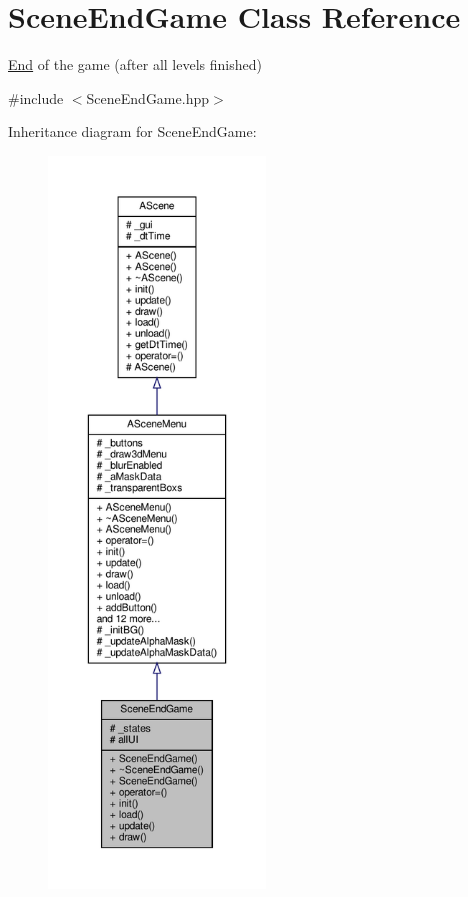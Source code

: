\hypertarget{class_scene_end_game}{}\section{Scene\+End\+Game Class Reference}
\label{class_scene_end_game}


\hyperlink{class_end}{End} of the game (after all levels finished)  




{\ttfamily \#include $<$Scene\+End\+Game.\+hpp$>$}



Inheritance diagram for Scene\+End\+Game\+:
\nopagebreak
\begin{figure}[H]
\begin{center}
\leavevmode
\includegraphics[height=550pt]{class_scene_end_game__inherit__graph}
\end{center}
\end{figure}



